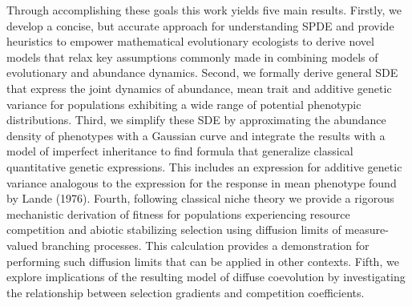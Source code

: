 \documentclass[]{article}
\begin{document}
Through accomplishing these goals this work yields five main results.
Firstly, we develop a concise, but accurate approach for understanding
SPDE and provide heuristics to empower mathematical evolutionary
ecologists to derive novel models that relax key assumptions commonly
made in combining models of evolutionary and abundance dynamics. Second,
we formally derive general SDE that express the joint dynamics of
abundance, mean trait and additive genetic variance for populations
exhibiting a wide range of potential phenotypic distributions. Third, we
simplify these SDE by approximating the abundance density of phenotypes
with a Gaussian curve and integrate the results with a model of
imperfect inheritance to find formula that generalize classical
quantitative genetic expressions. This includes an expression for
additive genetic variance analogous to the expression for the response
in mean phenotype found by Lande (1976). Fourth, following classical
niche theory we provide a rigorous mechanistic derivation of fitness for
populations experiencing resource competition and abiotic stabilizing
selection using diffusion limits of measure-valued branching processes.
This calculation provides a demonstration for performing such diffusion
limits that can be applied in other contexts. Fifth, we explore
implications of the resulting model of diffuse coevolution by
investigating the relationship between selection gradients and
competition coefficients.
\end{document}
